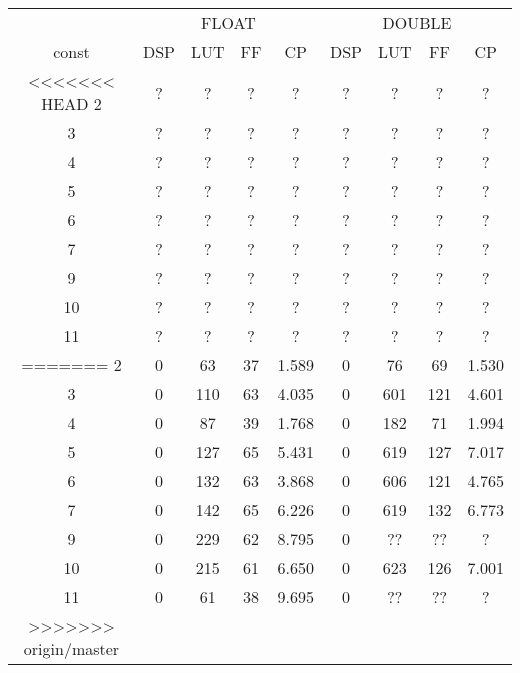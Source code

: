 \documentclass[10pt,a4paper,twoside]{article}
\begin{document}
\begin{tabular}{|c||c|c|c|c|c|c|c|c|}
    \hline
     & \multicolumn{4}{|c|}{FLOAT} &  \multicolumn{4}{|c|}{DOUBLE}\\
    const & DSP & LUT & FF & CP & DSP & LUT & FF & CP \\
    \hline
<<<<<<< HEAD
    2 & ? & ? & ? & ? & ? & ? & ? & ? \\
    \hline
    3 & ? & ? & ? & ? & ? & ? & ? & ? \\
    \hline
    4 & ? & ? & ? & ? & ? & ? & ? & ? \\
    \hline
    5 & ? & ? & ? & ? & ? & ? & ? & ? \\
    \hline
    6 & ? & ? & ? & ? & ? & ? & ? & ? \\
    \hline
    7 & ? & ? & ? & ? & ? & ? & ? & ? \\
    \hline
    9 & ? & ? & ? & ? & ? & ? & ? & ? \\
    \hline
    10 & ? & ? & ? & ? & ? & ? & ? & ? \\
    \hline
    11 & ? & ? & ? & ? & ? & ? & ? & ? \\
=======
    2 & 0 & 63 & 37 & 1.589 & 0 & 76 & 69 & 1.530 \\
    \hline
    3 & 0 & 110 & 63 & 4.035 & 0 & 601 & 121 & 4.601 \\
    \hline
    4 & 0 & 87 & 39 & 1.768 & 0 & 182 & 71 & 1.994 \\
    \hline
    5 & 0 & 127 & 65 & 5.431 & 0 & 619 & 127 & 7.017 \\
    \hline
    6 & 0 & 132 & 63 & 3.868 & 0 & 606 & 121 & 4.765 \\
    \hline
    7 & 0 & 142 & 65 & 6.226 & 0 & 619 & 132 & 6.773 \\
    \hline
    9 & 0 & 229 & 62 & 8.795 & 0 &  ?? & ?? & ? \\
    \hline
    10 & 0 & 215 & 61 & 6.650 & 0 & 623 & 126 & 7.001 \\
    \hline
    11 & 0 & 61 & 38 & 9.695 & 0 & ?? & ?? & ? \\
>>>>>>> origin/master
    \hline
\end{tabular}
\end{document}

